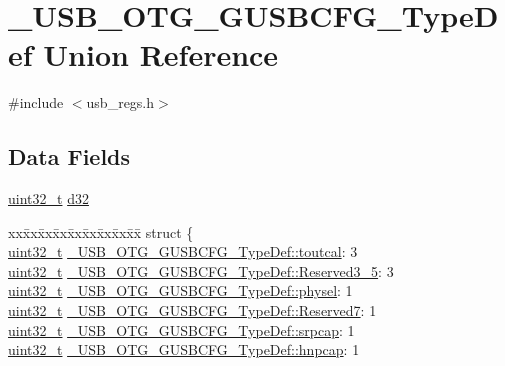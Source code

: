 \hypertarget{union___u_s_b___o_t_g___g_u_s_b_c_f_g___type_def}{\section{\-\_\-\-U\-S\-B\-\_\-\-O\-T\-G\-\_\-\-G\-U\-S\-B\-C\-F\-G\-\_\-\-Type\-Def Union Reference}
\label{union___u_s_b___o_t_g___g_u_s_b_c_f_g___type_def}
}


{\ttfamily \#include $<$usb\-\_\-regs.\-h$>$}

\subsection*{Data Fields}
\begin{DoxyCompactItemize}
\item 
\hyperlink{stdint_8h_a435d1572bf3f880d55459d9805097f62}{uint32\-\_\-t} \hyperlink{group___u_s_b___o_t_g___d_r_i_v_e_r_ga229098d7378c0af0ab0e164ea05b0e61}{d32}
\item 
\begin{tabbing}
xx\=xx\=xx\=xx\=xx\=xx\=xx\=xx\=xx\=\kill
struct \{\\
\>\hyperlink{stdint_8h_a435d1572bf3f880d55459d9805097f62}{uint32\_t} \hyperlink{group___u_s_b___o_t_g___d_r_i_v_e_r_ga5ff2c9d380b6cf9797c300917954d000}{\_USB\_OTG\_GUSBCFG\_TypeDef::toutcal}: 3\\
\>\hyperlink{stdint_8h_a435d1572bf3f880d55459d9805097f62}{uint32\_t} \hyperlink{group___u_s_b___o_t_g___d_r_i_v_e_r_gaaac4ee1a7a9421a2b6475a1696cb4746}{\_USB\_OTG\_GUSBCFG\_TypeDef::Reserved3\_5}: 3\\
\>\hyperlink{stdint_8h_a435d1572bf3f880d55459d9805097f62}{uint32\_t} \hyperlink{group___u_s_b___o_t_g___d_r_i_v_e_r_gaef0dede35984b2d149038b79a2baed90}{\_USB\_OTG\_GUSBCFG\_TypeDef::physel}: 1\\
\>\hyperlink{stdint_8h_a435d1572bf3f880d55459d9805097f62}{uint32\_t} \hyperlink{group___u_s_b___o_t_g___d_r_i_v_e_r_ga2c2590959125d7af13b63cdc8ade7955}{\_USB\_OTG\_GUSBCFG\_TypeDef::Reserved7}: 1\\
\>\hyperlink{stdint_8h_a435d1572bf3f880d55459d9805097f62}{uint32\_t} \hyperlink{group___u_s_b___o_t_g___d_r_i_v_e_r_gaeaeeae32b3c77bc22a522fc15bb74658}{\_USB\_OTG\_GUSBCFG\_TypeDef::srpcap}: 1\\
\>\hyperlink{stdint_8h_a435d1572bf3f880d55459d9805097f62}{uint32\_t} \hyperlink{group___u_s_b___o_t_g___d_r_i_v_e_r_gad727873756c868d916c2f2bec5f57dd8}{\_USB\_OTG\_GUSBCFG\_TypeDef::hnpcap}: 1\\

\end{tabbing}
\end{DoxyCompactItemize}
